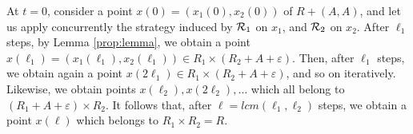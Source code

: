 At $t=0$, consider a point $x(0)=(x_1(0),x_2(0))$ of $R+(A,A)$,
and let us apply concurrently the strategy induced by ${\cal R}_1$
on $x_1$, and ${\cal R}_2$ on $x_2$.
After $\ell_1$ steps, by Lemma \ref{prop:lemma}, we obtain a point 
$x(\ell_1)=(x_1(\ell_1),x_2(\ell_1))\in R_1\times (R_2+A+\varepsilon)$.
Then, after $\ell_1$ steps,
we obtain again a point 
$x(2\ell_1)\in R_1\times (R_2+A+\varepsilon)$,
and so on iteratively.
Likewise, we obtain
points $x(\ell_2), x(2\ell_2),\dots$ which all belong to
$(R_1+A+\varepsilon)\times R_2$.
%
It follows that, after $\ell=lcm(\ell_1,\ell_2)$ steps, we obtain
a point $x(\ell)$ which belongs to $R_1\times R_2=R$.













